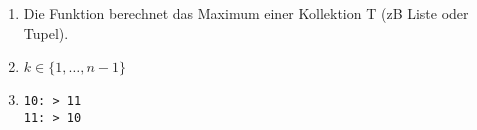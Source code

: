 \begin{enumerate}
	\item Die Funktion berechnet das Maximum einer Kollektion T (zB Liste oder Tupel).
	\item $k \in \{1,\ldots, n-1\}$
	\item \texttt{10: > 11}
	\\\texttt{11: > 10}
\end{enumerate}